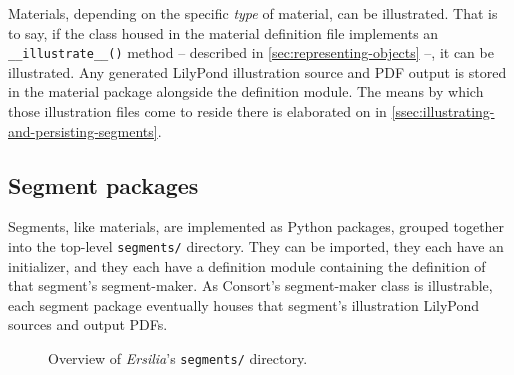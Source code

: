 Materials, depending on the specific \emph{type} of material, can be
illustrated. That is to say, if the class housed in the material definition
file implements an \texttt{\_\_illustrate\_\_()} method -- described in
\autoref{sec:representing-objects} --, it can be illustrated. Any generated
LilyPond illustration source and PDF output is stored in the material package
alongside the definition module. The means by which those illustration files
come to reside there is elaborated on in
\autoref{ssec:illustrating-and-persisting-segments}.

\subsection{Segment packages}
\label{ssec:segment-packages}

Segments, like materials, are implemented as Python packages, grouped together
into the top-level \texttt{segments/} directory. They can be imported, they
each have an initializer, and they each have a definition module containing the
definition of that segment's segment-maker. As Consort's segment-maker class is
illustrable, each segment package eventually houses that segment's illustration
LilyPond sources and output PDFs.

\begin{figure}[h!]
\begin{singlespacing}
\vspace{-0.5\baselineskip}
\end{singlespacing}
\caption{Overview of \emph{Ersilia}'s \texttt{segments/} directory.}
\end{figure}

